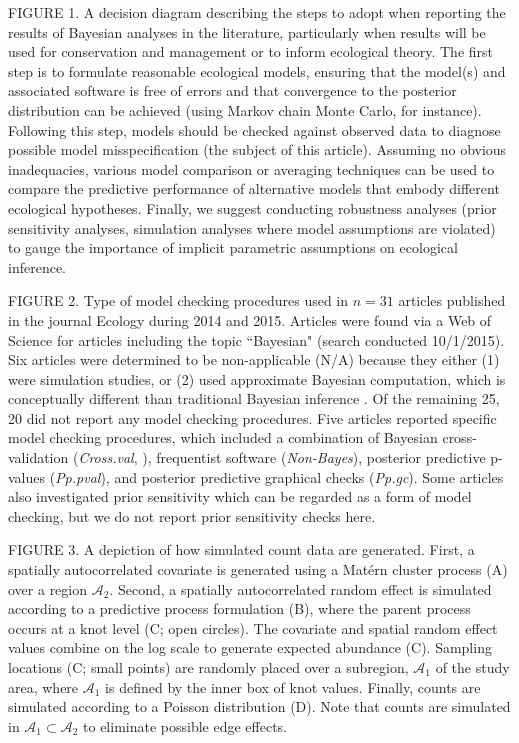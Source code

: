 \documentclass[12pt,english]{article}
\begin{document}
\begin{spacing}{1.9}
    FIGURE 1.  A decision diagram describing the steps to adopt when reporting the results of Bayesian analyses
    in the literature, particularly when results will be used for
    conservation and management or to inform ecological theory.  The
    first step is to formulate reasonable ecological models, ensuring
    that the model(s) and associated software is free of errors and
    that convergence to the posterior distribution can be achieved
    (using Markov chain Monte Carlo, for instance).  Following this
    step, models should be checked against observed data to diagnose
    possible model misspecification (the subject of this article).
    Assuming no obvious inadequacies, various model comparison or
    averaging techniques can be used to compare the predictive
    performance of alternative models that embody different ecological
    hypotheses.  Finally, we suggest conducting robustness analyses
    (prior sensitivity analyses, simulation analyses where model
    assumptions are violated) to gauge the importance of implicit
    parametric assumptions on ecological inference.

    FIGURE 2.  Type of model checking procedures used in $n=31$
    articles published in the journal Ecology during 2014 and
    2015. Articles were found via a Web of Science for articles
    including the topic ``Bayesian" (search conducted 10/1/2015).  Six
    articles were determined to be non-applicable (N/A) because they
    either (1) were simulation studies, or (2) used approximate
    Bayesian computation, which is conceptually different than
    traditional Bayesian inference \citep[see
    e.g.,][]{BeaumontEtAl2002}.  Of the remaining 25, 20 did not report
    any model checking procedures.  Five articles reported specific
    model checking procedures, which included a combination of
    Bayesian cross-validation (\textit{Cross.val}, ), frequentist
    software (\textit{Non-Bayes}), posterior predictive p-values
    (\textit{Pp.pval}), and posterior predictive graphical checks
    (\textit{Pp.gc}).  Some articles also investigated prior
    sensitivity which can be regarded as a form of model checking, but
    we do not report prior sensitivity checks here.

    FIGURE 3.  A depiction of how simulated count data are generated.
    First, a spatially autocorrelated covariate is generated using a
    Mat\'{e}rn cluster process (A) over a region $\mathcal{A}_2$.
    Second, a spatially autocorrelated random effect is simulated
    according to a predictive process formulation (B), where the
    parent process occurs at a knot level (C; open circles).  The
    covariate and spatial random effect values combine on the log
    scale to generate expected abundance (C).  Sampling locations (C;
    small points) are randomly placed over a subregion,
    $\mathcal{A}_1$ of the study area, where $\mathcal{A}_1$ is
    defined by the inner box of knot values. Finally, counts are
    simulated according to a Poisson distribution (D).  Note that
    counts are simulated in $\mathcal{A}_1 \subset \mathcal{A}_2$ to
    eliminate possible edge effects.


\end{spacing}
\end{document}
